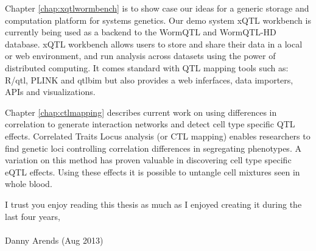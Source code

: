 \documentclass[8pt, twoside]{book}
\begin{document}
Chapter \ref{chap:xqtlwormbench} is to show case our ideas for a generic storage and 
computation platform for systems genetics. Our demo system xQTL workbench is currently 
being used as a backend to the WormQTL and WormQTL-HD database. xQTL workbench allows 
users to store and share their data in a local or web environment, and run analysis across 
datasets using the power of distributed computing. It comes standard with QTL mapping 
tools such as: R/qtl, PLINK and qtlbim but also provides a web inferfaces, data importers, 
APIs and visualizations.

Chapter \ref{chap:ctlmapping} describes current work on using differences in correlation to 
generate interaction networks and detect cell type specific QTL effects. Correlated Traits 
Locus analysis (or CTL mapping) enables researchers to find genetic loci controlling correlation 
differences in segregating phenotypes. A variation on this method has proven valuable in 
discovering cell type specific eQTL effects. Using these effects it is possible 
to untangle cell mixtures seen in whole blood.

I trust you enjoy reading this thesis as much as I enjoyed creating it during the last four years,\\\\

Danny Arends (Aug 2013)
\newpage
\thispagestyle{empty}

















{\footnotesize

}
\end{document}
